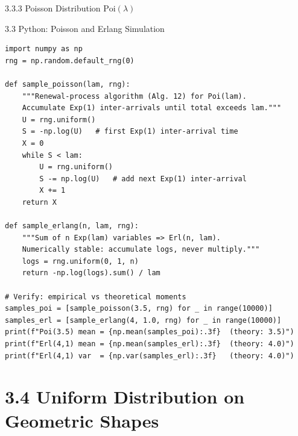 \documentclass[aspectratio=169,10pt]{beamer}
\begin{document}
\begin{frame}[allowframebreaks]{3.3.3 Poisson Distribution $\mathrm{Poi}(\lambda)$}
\end{frame}

\begin{frame}[fragile]{3.3 Python: Poisson and Erlang Simulation}
\begin{lstlisting}[style=python, caption={Ad hoc methods for Poisson and Erlang distributions (Algorithms 12 and Erlang sum)}]
import numpy as np
rng = np.random.default_rng(0)

def sample_poisson(lam, rng):
    """Renewal-process algorithm (Alg. 12) for Poi(lam).
    Accumulate Exp(1) inter-arrivals until total exceeds lam."""
    U = rng.uniform()
    S = -np.log(U)   # first Exp(1) inter-arrival time
    X = 0
    while S < lam:
        U = rng.uniform()
        S -= np.log(U)   # add next Exp(1) inter-arrival
        X += 1
    return X

def sample_erlang(n, lam, rng):
    """Sum of n Exp(lam) variables => Erl(n, lam).
    Numerically stable: accumulate logs, never multiply."""
    logs = rng.uniform(0, 1, n)
    return -np.log(logs).sum() / lam

# Verify: empirical vs theoretical moments
samples_poi = [sample_poisson(3.5, rng) for _ in range(10000)]
samples_erl = [sample_erlang(4, 1.0, rng) for _ in range(10000)]
print(f"Poi(3.5) mean = {np.mean(samples_poi):.3f}  (theory: 3.5)")
print(f"Erl(4,1) mean = {np.mean(samples_erl):.3f}  (theory: 4.0)")
print(f"Erl(4,1) var  = {np.var(samples_erl):.3f}   (theory: 4.0)")
\end{lstlisting}
\end{frame}

\section{3.4 Uniform Distribution on Geometric Shapes}
\end{document}
